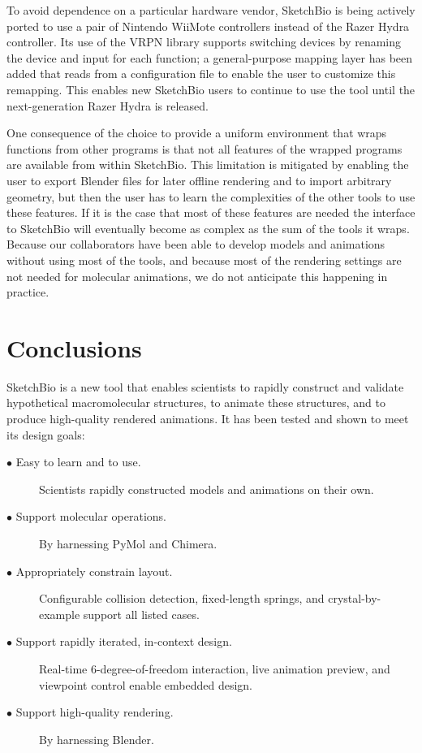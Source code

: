 \documentclass[twocolumn]{bmcart}%
\begin{document}
To avoid dependence on a particular hardware vendor, SketchBio is being actively ported to use a pair of Nintendo WiiMote controllers instead of the Razer Hydra controller.
Its use of the VRPN library supports switching devices by renaming the device and input for each function; a general-purpose mapping layer has been added that reads from a configuration file to enable the user to customize this remapping.
This enables new SketchBio users to continue to use the tool until the next-generation Razer Hydra is released.

One consequence of the choice to provide a uniform environment that wraps functions from other programs is that not all features of the wrapped programs are available from within SketchBio. This limitation is mitigated by enabling the user to export Blender files for later offline rendering and to import arbitrary geometry, but then the user has to learn the complexities of the other tools to use these features. If it is the case that most of these features are needed the interface to SketchBio will eventually become as complex as the sum of the tools it wraps. Because our collaborators have been able to develop models and animations without using most of the tools, and because most of the rendering settings are not needed for molecular animations, we do not anticipate this happening in practice.

\section*{Conclusions}
SketchBio is a new tool that enables scientists to rapidly construct and validate hypothetical macromolecular structures, to animate these structures, and to produce high-quality rendered animations.
It has been tested and shown to meet its design goals:
\begin{description}
  \item[$\bullet$ Easy to learn and to use.] Scientists rapidly constructed models and animations on their own.
  \item[$\bullet$ Support molecular operations.] By harnessing PyMol and Chimera.
  \item[$\bullet$ Appropriately constrain layout.] Configurable collision detection, fixed-length springs, and crystal-by-example support all listed cases.
  \item[$\bullet$ Support rapidly iterated, in-context design.] Real-time 6-degree-of-freedom interaction, live animation preview, and viewpoint control enable embedded design.
  \item[$\bullet$ Support high-quality rendering.] By harnessing Blender.
\end{description}
\end{document}
